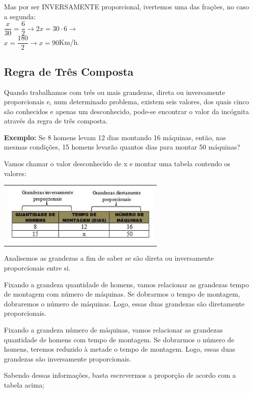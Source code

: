 \begin{multicols*}{2}
    Mas por ser INVERSAMENTE proporcional, ivertemos uma das frações, no caso a segunda:\\

    $ \dfrac{x}{30} = \dfrac{6}{2} \to 2x = 30\cdot 6 \to$\\

    $ x = \dfrac{180}{2} \to x = 90 $Km/h.

    \subsection{Regra de Três Composta}

    Quando trabalhamos com três ou mais grandezas, direta ou inversamente proporcionais e, num determinado problema, existem seis valores, dos quais cinco são conhecidos e apenas um desconhecido, pode-se encontrar o valor da incógnita através da regra de três composta.

    \textbf{Exemplo:} Se 8 homens levam 12 dias montando 16 máquinas, então, nas mesmas condições, 15 homens levarão quantos dias para montar 50 máquinas?

    Vamos chamar o valor desconhecido de x e montar uma tabela contendo os valores:

    \begin{tabular}{@{}c@{}}
        \includegraphics[height=30mm]{assets/R3composta.jpg}
    \end{tabular}

    Analisemos as grandezas a fim de saber se são direta ou inversamente proporcionais entre si.

    Fixando a grandeza quantidade de homens, vamos relacionar as grandezas tempo de montagem com número de máquinas. Se dobrarmos o tempo de montagem, dobraremos o número de máquinas. Logo, essas duas grandezas são diretamente proporcionais.

    Fixando a grandeza número de máquinas, vamos relacionar as grandezas quantidade de homens com tempo de montagem. Se dobrarmos o número de homens, teremos reduzido à metade o tempo de montagem. Logo, essas duas grandezas são inversamente proporcionais.

    Sabendo dessas informações, basta escrevermos a proporção de acordo com a tabela acima;


\end{multicols*}
